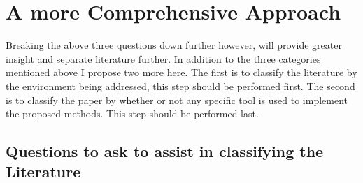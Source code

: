 \documentclass[10pt]{IEEEtran}
\begin{document}
\section{A more Comprehensive Approach}
Breaking the above three questions down further however, will provide greater insight and separate literature further. In addition to the three categories mentioned above I propose two more here. The first is to classify the literature by the environment being addressed, this step should be performed first. The second is to classify the paper by whether or not any specific tool is used to implement the proposed methods. This step should be performed last.\\

\subsection{Questions to ask to assist in classifying the Literature}
\end{document}
